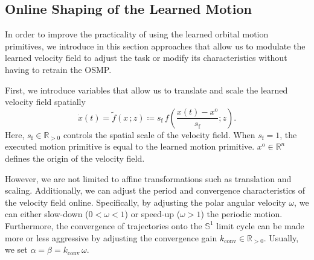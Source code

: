 \subsection{Online Shaping of the Learned Motion}
In order to improve the practicality of using the learned orbital motion primitives, we introduce in this section approaches that allow us to modulate the learned velocity field to adjust the task or modify its characteristics without having to retrain the \gls{OSMP}. 

First, we introduce variables that allow us to translate and scale the learned velocity field spatially
\begin{equation}
    \dot{x}(t) = \tilde{f}(x \, ;z) \coloneq s_\mathrm{f} \, f \left ( \frac{x(t)-x^\mathrm{o}}{s_\mathrm{f}}; z \right ).
\end{equation}
Here, $s_\mathrm{f} \in \mathbb{R}_{>0}$ controls the spatial scale of the velocity field. When $s_\mathrm{f} = 1$, the executed motion primitive is equal to the learned motion primitive. $x^\mathrm{o} \in \mathbb{R}^{n}$ defines the origin of the velocity field.

However, we are not limited to affine transformations such as translation and scaling. Additionally, we can adjust the period and convergence characteristics of the velocity field online. Specifically, by adjusting the polar angular velocity $\omega$, we can either slow-down ($0 < \omega < 1$) or speed-up ($\omega > 1$) the periodic motion.
Furthermore, the convergence of trajectories onto the $\mathbb{S}^1$ limit cycle can be made more or less aggressive by adjusting the convergence gain $k_\mathrm{conv} \in \mathbb{R}_{>0}$. Usually, we set $\alpha = \beta = k_\mathrm{conv} \, \omega$.

